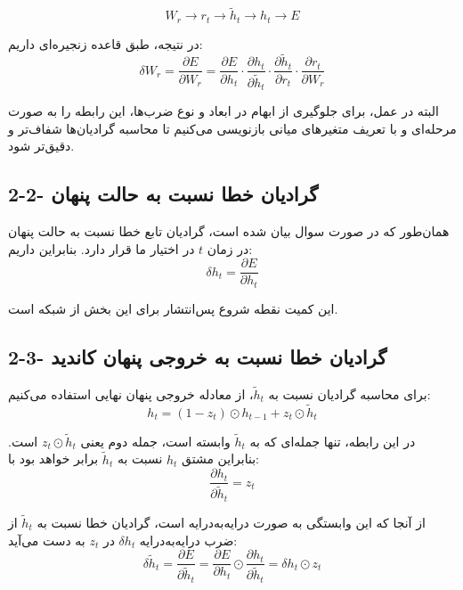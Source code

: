 \documentclass{article}
\begin{document}
\begin{equation}
	W_r \rightarrow r_t \rightarrow \widetilde{h}_t \rightarrow h_t \rightarrow E
\end{equation}

در نتیجه، طبق قاعده زنجیره‌ای داریم:
\begin{equation}
	\delta W_r=\frac{\partial E}{\partial W_r}
	=
	\frac{\partial E}{\partial h_t}
	\cdot
	\frac{\partial h_t}{\partial \widetilde{h}_t}
	\cdot
	\frac{\partial \widetilde{h}_t}{\partial r_t}
	\cdot
	\frac{\partial r_t}{\partial W_r}
\end{equation}

البته در عمل، برای جلوگیری از ابهام در ابعاد و نوع ضرب‌ها، این رابطه را به صورت مرحله‌ای و با تعریف متغیرهای میانی بازنویسی می‌کنیم تا محاسبه گرادیان‌ها شفاف‌تر و دقیق‌تر شود.

\subsection{2-2- گرادیان خطا نسبت به حالت پنهان}

همان‌طور که در صورت سوال بیان شده است، گرادیان تابع خطا نسبت به حالت پنهان در زمان $t$ در اختیار ما قرار دارد. بنابراین داریم:
\begin{equation}
	\delta h_t=\frac{\partial E}{\partial h_t}
\end{equation}

این کمیت نقطه شروع پس‌انتشار برای این بخش از شبکه است.

\subsection{2-3- گرادیان خطا نسبت به خروجی پنهان کاندید}

برای محاسبه گرادیان نسبت به $\widetilde{h}_t$، از معادله خروجی پنهان نهایی استفاده می‌کنیم:
\begin{equation}
	h_t=(1-z_t)\odot h_{t-1}+z_t\odot \widetilde{h}_t
\end{equation}

در این رابطه، تنها جمله‌ای که به $\widetilde{h}_t$ وابسته است، جمله دوم یعنی $z_t\odot \widetilde{h}_t$ است.  
بنابراین مشتق $h_t$ نسبت به $\widetilde{h}_t$ برابر خواهد بود با:
\begin{equation}
	\frac{\partial h_t}{\partial \widetilde{h}_t}=z_t
\end{equation}

از آنجا که این وابستگی به صورت درایه‌به‌درایه است، گرادیان خطا نسبت به $\widetilde{h}_t$ از ضرب درایه‌به‌درایه $\delta h_t$ در $z_t$ به دست می‌آید:
\begin{equation}
	\delta \widetilde{h}_t
	=
	\frac{\partial E}{\partial \widetilde{h}_t}
	=
	\frac{\partial E}{\partial h_t}
	\odot
	\frac{\partial h_t}{\partial \widetilde{h}_t}
	=
	\delta h_t\odot z_t
\end{equation}
\end{document}
